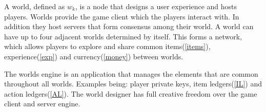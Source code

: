 \documentclass[runningheads,a4paper]{llncs}
\begin{document}
A world, defined as $w_k$, is a node that designs a user experience and hosts players. Worlds provide the game client which the players interact with. In addition they host servers that form consensus among their world. A world can have up to four adjacent worlds determined by itself. This forms a network, which allows players to explore and share common items(\ref{items}), experience(\ref{exp}) and currency(\ref{money}) between worlds.

\begin{small}
\begin{center}
\end{center}
\end{small}
The worlds engine is an application that manages the elements that are common throughout all worlds. Examples being: player private keys, item ledgers(\ref{IL}) and action ledgers(\ref{AL}). The world designer has full creative freedom over the game client and server engine. 
\end{document}
